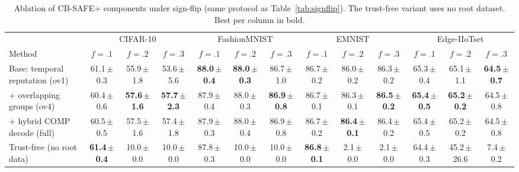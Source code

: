 \begin{table}[t]\centering\footnotesize
\caption{Ablation of CB-SAFE+ components under sign-flip (same protocol as Table~\ref{tab:signflip}). The trust-free variant uses no root dataset. Best per column in bold.}
\label{tab:ablation-variants}
\setlength{\tabcolsep}{1.7pt}
\begin{tabular}{@{}lcccccccccccc@{}}\toprule
& \multicolumn{3}{c}{CIFAR-10} & \multicolumn{3}{c}{FashionMNIST} & \multicolumn{3}{c}{EMNIST} & \multicolumn{3}{c}{Edge-IIoTset}\\
\cmidrule(lr){2-4}\cmidrule(lr){5-7}\cmidrule(lr){8-10}\cmidrule(l){11-13}
Method & $f{=}.1$ & $f{=}.2$ & $f{=}.3$ & $f{=}.1$ & $f{=}.2$ & $f{=}.3$ & $f{=}.1$ & $f{=}.2$ & $f{=}.3$ & $f{=}.1$ & $f{=}.2$ & $f{=}.3$\\\midrule
Base: temporal reputation (ov1) & 61.1\,{\scriptsize$\pm$0.3} & 55.9\,{\scriptsize$\pm$1.8} & 53.6\,{\scriptsize$\pm$5.6} & \textbf{88.0\,{\scriptsize$\pm$0.4}} & \textbf{88.0\,{\scriptsize$\pm$0.3}} & 86.7\,{\scriptsize$\pm$1.0} & 86.7\,{\scriptsize$\pm$0.2} & 86.0\,{\scriptsize$\pm$0.2} & 86.3\,{\scriptsize$\pm$0.2} & 65.3\,{\scriptsize$\pm$0.4} & 65.1\,{\scriptsize$\pm$1.1} & \textbf{64.5\,{\scriptsize$\pm$0.7}}\\
\;+ overlapping groups (ov4) & 60.4\,{\scriptsize$\pm$0.6} & \textbf{57.6\,{\scriptsize$\pm$1.6}} & \textbf{57.7\,{\scriptsize$\pm$2.3}} & 87.9\,{\scriptsize$\pm$0.4} & 88.0\,{\scriptsize$\pm$0.3} & \textbf{86.9\,{\scriptsize$\pm$0.8}} & 86.7\,{\scriptsize$\pm$0.1} & 86.3\,{\scriptsize$\pm$0.1} & \textbf{86.5\,{\scriptsize$\pm$0.2}} & \textbf{65.4\,{\scriptsize$\pm$0.5}} & \textbf{65.2\,{\scriptsize$\pm$0.2}} & 64.5\,{\scriptsize$\pm$0.8}\\
\;+ hybrid COMP decode (full) & 60.5\,{\scriptsize$\pm$0.5} & 57.5\,{\scriptsize$\pm$1.6} & 57.4\,{\scriptsize$\pm$1.8} & 87.9\,{\scriptsize$\pm$0.3} & 88.0\,{\scriptsize$\pm$0.4} & 86.9\,{\scriptsize$\pm$0.8} & 86.7\,{\scriptsize$\pm$0.2} & \textbf{86.4\,{\scriptsize$\pm$0.1}} & 86.4\,{\scriptsize$\pm$0.2} & 65.4\,{\scriptsize$\pm$0.5} & 65.2\,{\scriptsize$\pm$0.2} & 64.5\,{\scriptsize$\pm$0.8}\\
Trust-free (no root data) & \textbf{61.4\,{\scriptsize$\pm$0.4}} & 10.0\,{\scriptsize$\pm$0.0} & 10.0\,{\scriptsize$\pm$0.0} & 87.8\,{\scriptsize$\pm$0.3} & 10.0\,{\scriptsize$\pm$0.0} & 10.0\,{\scriptsize$\pm$0.0} & \textbf{86.8\,{\scriptsize$\pm$0.1}} & 2.1\,{\scriptsize$\pm$0.0} & 2.1\,{\scriptsize$\pm$0.0} & 64.4\,{\scriptsize$\pm$0.3} & 45.2\,{\scriptsize$\pm$26.6} & 7.4\,{\scriptsize$\pm$0.2}\\
\bottomrule\end{tabular}\end{table}